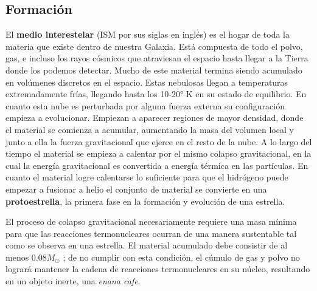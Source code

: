 \subsection{Formación}


El \textbf{medio interestelar} (ISM por sus siglas en inglés) es el hogar de
toda la materia que existe dentro de nuestra Galaxia. Está compuesta de todo el
polvo, gas, e incluso los rayos cósmicos que atraviesan el espacio hasta llegar
a la Tierra donde los podemos detectar. Mucho de este material termina siendo
acumulado en volúmenes discretos en el espacio. Estas nebulosas llegan a
temperaturas extremadamente frías, llegando hasta los 10-20° K en su estado de
equilibrio. En cuanto esta nube es perturbada por alguna fuerza externa su
configuración empieza a evolucionar. Empiezan a aparecer regiones de mayor
densidad, donde el material se comienza a acumular, aumentando la masa del
volumen local y junto a ella la fuerza gravitacional que ejerce en el resto de
la nube. A lo largo del tiempo el material se empieza a calentar por el mismo
colapso gravitacional, en la cual la energía gravitacional es convertida a
energía térmica en las partículas. En cuanto el material logre calentarse lo
suficiente para que el hidrógeno puede empezar a fusionar a helio el conjunto de
material se convierte en una \textbf{protoestrella}, la primera fase en la
formación y evolución de una estrella.


El proceso de colapso gravitacional necesariamente requiere una masa mínima para
que las reacciones termonucleares ocurran de una manera sustentable tal como se
observa en una estrella. El material acumulado debe consistir de al menos $0.08
M_{\odot}$ \citet*{anIntroStellarAstro::chapter2_stellarFormation}; de no
cumplir con esta condición, el cúmulo de gas y polvo no logrará mantener la
cadena de reacciones termonucleares en su núcleo, resultando en un objeto
inerte, una \textit{enana cafe}.